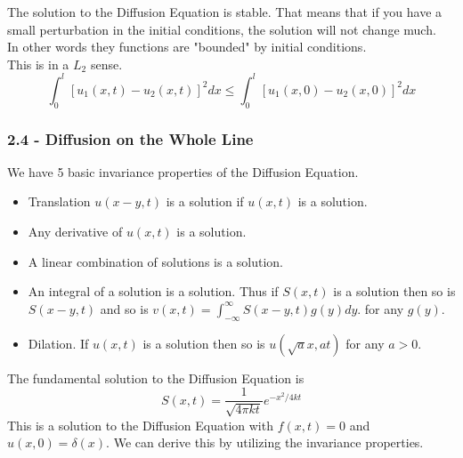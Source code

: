 \documentclass[answers,12pt,addpoints]{exam}
\begin{document}
\begin{definition}[Stablitity]
    The solution to the Diffusion Equation is stable. That means that if you have a small perturbation in the initial conditions, the solution will not change much.\\
    In other words they functions are "bounded" by initial conditions.\\
    This is in a $L_2$ sense.
    $$ \int_0^l [u_1(x,t) - u_2(x,t)]^2 dx \leq \int_0^l [u_1(x,0) - u_2(x,0)]^2 dx$$
\end{definition}
\subsubsection{2.4 - Diffusion on the Whole Line}
\begin{definition}
    We have 5 basic invariance properties of the Diffusion Equation.
    \begin{itemize}
        \item Translation $u(x - y, t)$ is a solution if $u(x,t)$ is a solution.
        \item Any derivative of $u(x,t)$ is a solution. 
        \item A linear combination of solutions is a solution.
        \item An integral of a solution is a solution. Thus if $S(x,t)$ is a solution then so is $S(x - y, t)$ and so is $v(x,t) = \int_{-\infty}^\infty S(x - y, t) g(y) dy$. for any $g(y)$.
        \item Dilation. If $u(x,t)$ is a solution then so is $u(\sqrt{a}x, at)$ for any $a > 0$.
    \end{itemize}
\end{definition}
\begin{definition}
    The fundamental solution to the Diffusion Equation is 
    $$ S(x,t) = \frac{1}{\sqrt{4\pi kt}} e^{-x^2/4kt}$$
    This is a solution to the Diffusion Equation with $f(x,t) = 0$ and $u(x,0) = \delta(x)$.
    We can derive this by utilizing the invariance properties.
\end{definition}
\end{document}
